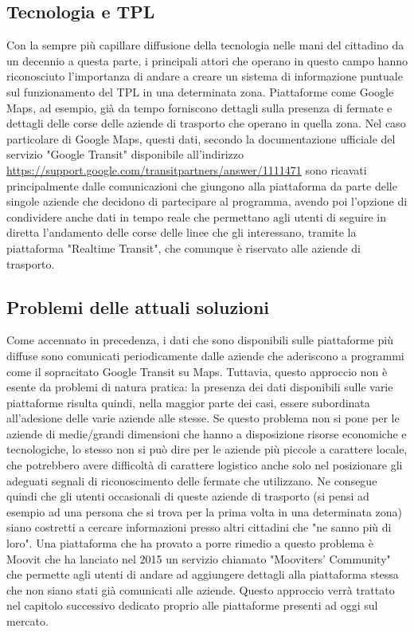     \subsection{Tecnologia e TPL}
    Con la sempre più capillare diffusione della tecnologia nelle mani del cittadino da un decennio a questa parte, i principali attori che operano in questo campo hanno riconosciuto l'importanza di andare a creare un sistema di informazione puntuale sul funzionamento del TPL in una determinata zona. Piattaforme come Google Maps, ad esempio, già da tempo forniscono dettagli sulla presenza di fermate e dettagli delle corse delle aziende di trasporto che operano in quella zona. 
    Nel caso particolare di Google Maps, questi dati, secondo la documentazione ufficiale del servizio "Google Transit" disponibile all'indirizzo \url{https://support.google.com/transitpartners/answer/1111471} sono ricavati principalmente dalle comunicazioni che giungono alla piattaforma da parte delle singole aziende che decidono di partecipare al programma, avendo poi l'opzione di condividere anche dati in tempo reale che permettano agli utenti di seguire in diretta l'andamento delle corse delle linee che gli interessano, tramite la piattaforma "Realtime Transit", che comunque è riservato alle aziende di trasporto.

    \subsection{Problemi delle attuali soluzioni}
    Come accennato in precedenza, i dati che sono disponibili sulle piattaforme più diffuse sono comunicati periodicamente dalle aziende che aderiscono a programmi come il sopracitato Google Transit su Maps. 
    Tuttavia, questo approccio non è esente da problemi di natura pratica: la presenza dei dati disponibili sulle varie piattaforme risulta quindi, nella maggior parte dei casi, essere subordinata all'adesione delle varie aziende alle stesse. Se questo problema non si pone per le aziende di medie/grandi dimensioni che hanno a disposizione risorse economiche e tecnologiche, lo stesso non si può dire per le aziende più piccole a carattere locale, che potrebbero avere difficoltà di carattere logistico anche solo nel posizionare gli adeguati segnali di riconoscimento delle fermate che utilizzano.
    Ne consegue quindi che gli utenti occasionali di queste aziende di trasporto (si pensi ad esempio ad una persona che si trova per la prima volta in una determinata zona) siano costretti a cercare informazioni presso altri cittadini che "ne sanno più di loro".
    Una piattaforma che ha provato a porre rimedio a questo problema è Moovit che ha lanciato nel 2015 un servizio chiamato "Mooviters' Community" che permette agli utenti di andare ad aggiungere dettagli alla piattaforma stessa che non siano stati già comunicati alle aziende. Questo approccio verrà trattato nel capitolo successivo dedicato proprio alle piattaforme presenti ad oggi sul mercato. 

